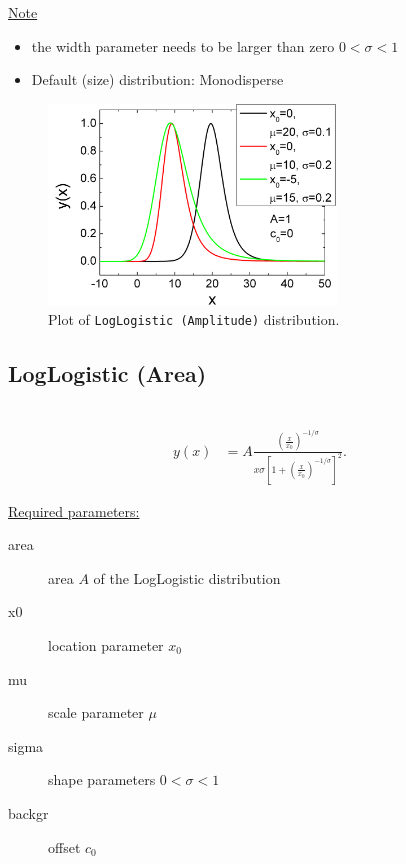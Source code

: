 \underline{Note}
\begin{itemize}
  \item the width parameter needs to be larger than zero $0<\sigma <1$
  \item Default (size) distribution: Monodisperse
\end{itemize}


\begin{figure}[htb]
\begin{center}
\includegraphics[width=0.6824\textwidth]{LogLogisticAmplitude.png}
\end{center}
\caption{Plot of \texttt{LogLogistic (Amplitude)} distribution.}
\label{fig:LogLogisticAmplitude}
\end{figure}

\clearpage
\subsection{LogLogistic (Area)} ~\\
\label{sec:LogLogisticArea}
\begin{align}
y(x) &= A \frac{ \left(\frac{x}{x_0}\right)^{-1/\sigma} } { x\sigma\left[ 1+\left(\frac{x}{x_0}\right)^{-1/\sigma} \right]^2 }.
\end{align}

\underline{Required parameters:}
\begin{description}
    \item[area] area $A$ of the LogLogistic distribution
    \item[x0] location parameter $x_0$
    \item[mu] scale parameter $\mu$
    \item[sigma] shape parameters $0 < \sigma < 1$
    \item[backgr] offset $c_0$
\end{description}

